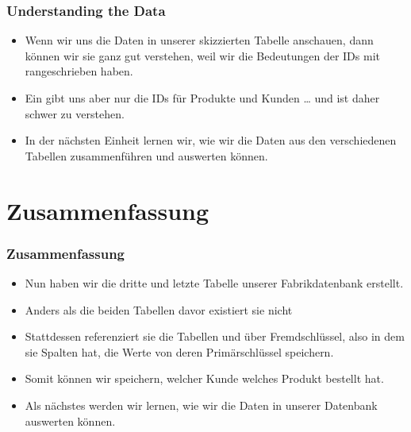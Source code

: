 \documentclass[aspectratio=169,mathserif,notheorems]{beamer}%
\begin{document}
\begin{frame}[t]
\frametitle{Understanding the Data}%
\begin{itemize}%
\item Wenn wir uns die Daten in unserer skizzierten Tabelle anschauen, dann können wir sie ganz gut verstehen, weil wir die Bedeutungen der IDs mit rangeschrieben haben.%
\item<2-> Ein  gibt uns aber nur die IDs für Produkte und Kunden {\dots} und ist daher schwer zu verstehen.%
\item<3-> In der nächsten Einheit lernen wir, wie wir die Daten aus den verschiedenen Tabellen zusammenführen und auswerten können.%
\end{itemize}%
%
\end{frame}%
%
\section{Zusammenfassung}%
%
\begin{frame}%
\frametitle{Zusammenfassung}%
\begin{itemize}%
\item Nun haben wir die dritte und letzte Tabelle unserer Fabrikdatenbank erstellt.%
\item<2-> Anders als die beiden Tabellen davor existiert sie nicht %
\item<3-> Stattdessen referenziert sie die Tabellen  und  über Fremdschlüssel, also in dem sie Spalten hat, die Werte von deren Primärschlüssel speichern.%
\item<4-> Somit können wir speichern, welcher Kunde welches Produkt bestellt hat.%
\item<5-> Als nächstes werden wir lernen, wie wir die Daten in unserer Datenbank auswerten können.%
\end{itemize}%
\end{frame}%
%
\endPresentation%
\end{document}
